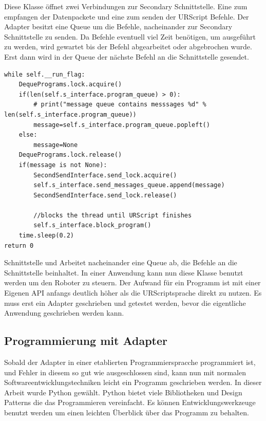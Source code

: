 Diese Klasse öffnet zwei Verbindungen zur Secondary Schnittstelle. Eine zum empfangen der Datenpackete und eine zum senden der URScript Befehle. Der Adapter besitzt eine \ac{Queue} um die Befehle, nacheinander zur Secondary Schnittstelle zu senden. Da Befehle eventuell viel Zeit benötigen, um ausgeführt zu werden, wird gewartet bis der Befehl abgearbeitet oder abgebrochen wurde. Erst dann wird in der Queue der nächste Befehl an die Schnittstelle gesendet.

\begin{lstlisting}[caption={Ausschnitt zeigt die Abarbeitung der Queue}, label=lst:adapter_queue ,captionpos=b] 
while self.__run_flag:
    DequePrograms.lock.acquire()
    if(len(self.s_interface.program_queue) > 0):
        # print("message queue contains messsages %d" % len(self.s_interface.program_queue))
        message=self.s_interface.program_queue.popleft()
    else:
        message=None
    DequePrograms.lock.release()
    if(message is not None):
        SecondSendInterface.send_lock.acquire()
        self.s_interface.send_messages_queue.append(message)
        SecondSendInterface.send_lock.release()

        //blocks the thread until URScript finishes
        self.s_interface.block_program()
    time.sleep(0.2)
return 0
\end{lstlisting}

Schnittstelle und Arbeitet nacheinander eine Queue ab, die Befehle an die Schnittstelle beinhaltet.
In einer Anwendung kann nun diese Klasse benutzt werden um den Roboter zu steuern.
Der Aufwand für ein Programm ist mit einer Eigenen API anfangs deutlich höher als die URScriptsprache direkt zu nutzen. Es muss erst ein Adapter geschrieben und getestet werden, bevor die eigentliche Anwendung geschrieben werden kann. 

\subsection{Programmierung mit Adapter}
\label{programmierung_mit_hoerherer_schicht}

Sobald der Adapter in einer etablierten Programmierspracche programmiert ist, und Fehler in diesem so gut wie ausgeschlossen sind, kann nun mit normalen Softwareentwicklungstechniken leicht ein Programm geschrieben werden. In dieser Arbeit wurde Python gewählt. Python bietet viele Bibliotheken und Design Patterns die das Programmieren vereinfacht. Es können Entwicklungswerkzeuge benutzt werden um einen leichten Überblick über das Programm zu behalten.


